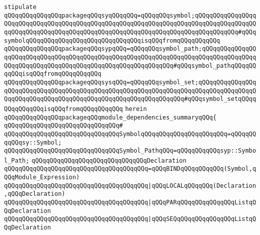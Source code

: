 \newline
\newline
\verb|stipulate|\newline
\verb|qQQqqQQqqQQqqQQqpackageqQQqsyqQQqqQQq=qQQqqQQqsymbol;qQQqqQQqqQQqqQQqqQQqqQQqqQQqqQQqqQQqqQQqqQQqqQQqqQQqqQQqqQQqqQQqqQQqqQQqqQQqqQQqqQQqqQQqqQQqqQQqqQQqqQQqqQQqqQQqqQQqqQQqqQQqqQQqqQQqqQQqqQQqqQQqqQQqqQQq#qQQqsymbolqQQqqQQqqQQqqQQqqQQqqQQqqQQqqQQqisqQQqfromqQQqqQQqqQQq|\newline
\verb|qQQqqQQqqQQqqQQqpackageqQQqsypqQQq=qQQqqQQqsymbol_path;qQQqqQQqqQQqqQQqqQQqqQQqqQQqqQQqqQQqqQQqqQQqqQQqqQQqqQQqqQQqqQQqqQQqqQQqqQQqqQQqqQQqqQQqqQQqqQQqqQQqqQQqqQQqqQQqqQQqqQQqqQQqqQQqqQQq#qQQqsymbol_pathqQQqqQQqqQQqisqQQqfromqQQqqQQqqQQq|\newline
\verb|qQQqqQQqqQQqqQQqpackageqQQqsysqQQq=qQQqqQQqsymbol_set;qQQqqQQqqQQqqQQqqQQqqQQqqQQqqQQqqQQqqQQqqQQqqQQqqQQqqQQqqQQqqQQqqQQqqQQqqQQqqQQqqQQqqQQqqQQqqQQqqQQqqQQqqQQqqQQqqQQqqQQqqQQqqQQqqQQqqQQq#qQQqsymbol_setqQQqqQQqqQQqqQQqisqQQqfromqQQqqQQqqQQq|\newline
\verb|herein|\newline
\newline
\verb|qQQqqQQqqQQqqQQqpackageqQQqmodule_dependencies_summaryqQQq{|\newline
\verb|qQQqqQQqqQQqqQQqqQQqqQQqqQQqqQQq#|\newline
\verb|qQQqqQQqqQQqqQQqqQQqqQQqqQQqqQQqSymbolqQQqqQQqqQQqqQQqqQQqqQQq=qQQqqQQqqQQqsy::Symbol;|\newline
\verb|qQQqqQQqqQQqqQQqqQQqqQQqqQQqqQQqSymbol_PathqQQq=qQQqqQQqqQQqsyp::Symbol_Path;|\newline
\newline
\verb|qQQqqQQqqQQqqQQqqQQqqQQqqQQqqQQqDeclaration|\newline
\verb|qQQqqQQqqQQqqQQqqQQqqQQqqQQqqQQqqQQqqQQq=qQQqBINDqQQqqQQqqQQq(Symbol,qQQqModule_Expression)|\newline
\verb|qQQqqQQqqQQqqQQqqQQqqQQqqQQqqQQqqQQqqQQq|\verb#|qQQqLOCALqQQqqQQq(Declaration,qQQqDeclaration)#\newline
\verb|qQQqqQQqqQQqqQQqqQQqqQQqqQQqqQQqqQQqqQQq|\verb#|qQQqPARqQQqqQQqqQQqqQQqListqQQqDeclaration#\newline
\verb|qQQqqQQqqQQqqQQqqQQqqQQqqQQqqQQqqQQqqQQq|\verb#|qQQqSEQqQQqqQQqqQQqqQQqListqQQqDeclaration#\newline
